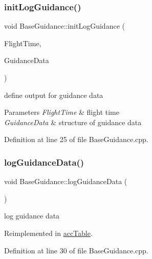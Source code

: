 \subsubsection{\texorpdfstring{init\+Log\+Guidance()}{initLogGuidance()}}
{\footnotesize\ttfamily void Base\+Guidance\+::init\+Log\+Guidance (\begin{DoxyParamCaption}\item[{\hyperlink{group___tools_ga3f1431cb9f76da10f59246d1d743dc2c}{Float64}}]{Flight\+Time,  }\item[{Guidance\+Struct \&}]{Guidance\+Data }\end{DoxyParamCaption})\hspace{0.3cm}{\ttfamily [virtual]}}



define output for guidance data 


\begin{DoxyParams}{Parameters}
{\em Flight\+Time} & flight time \\
\hline
{\em Guidance\+Data} & structure of guidance data \\
\hline
\end{DoxyParams}


Definition at line 25 of file Base\+Guidance.\+cpp.

\mbox{\label{class_base_guidance_af3bd60f6f17739864fbfa3ec2467ae04}} 
\subsubsection{\texorpdfstring{log\+Guidance\+Data()}{logGuidanceData()}}
{\footnotesize\ttfamily void Base\+Guidance\+::log\+Guidance\+Data (\begin{DoxyParamCaption}{ }\end{DoxyParamCaption})\hspace{0.3cm}{\ttfamily [virtual]}}



log guidance data 



Reimplemented in \hyperlink{classacc_table_ace4665dcb6e791bbd30ba0f0abb79461}{acc\+Table}.



Definition at line 30 of file Base\+Guidance.\+cpp.



